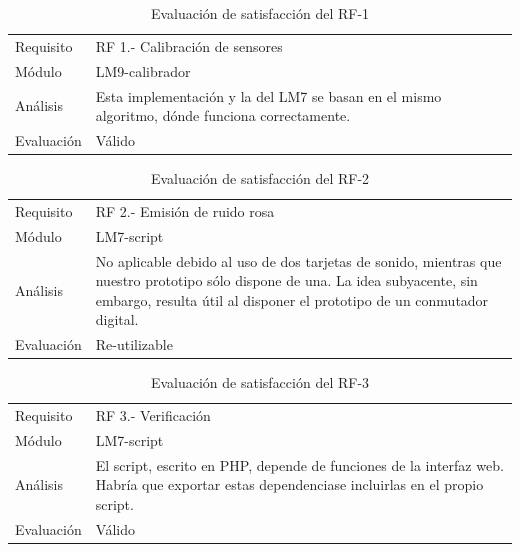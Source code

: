 \begin{table}[h]
\centering
\begin{tabularx}{1\textwidth}{l|X}
Requisito  & RF 1.- Calibración de sensores                                                                 \\
Módulo     & LM9-calibrador                                                                              \\
Análisis   & Esta implementación y la del \acrshort{LM7} se basan en el mismo algoritmo, dónde funciona correctamente. \\
Evaluación & Válido
\end{tabularx}
\caption{Evaluación de satisfacción del RF-1}
\end{table}

\begin{table}[h]
\centering
\begin{tabularx}{1\textwidth}{l|X}
Requisito  & RF 2.- Emisión de ruido rosa                                                                \\
Módulo     & LM7-script                                                                              \\
Análisis   & No aplicable debido al uso de dos tarjetas de sonido, mientras que nuestro prototipo sólo dispone de una. La idea subyacente, sin embargo, resulta útil al disponer el prototipo de un conmutador digital. \\
Evaluación & Re-utilizable
\end{tabularx}
\caption{Evaluación de satisfacción del RF-2}
\end{table}

\begin{table}[h]
\centering
\begin{tabularx}{1\textwidth}{l|X}
Requisito  & RF 3.- Verificación                                                                \\
Módulo     & LM7-script                                                                             \\
Análisis   & El script, escrito en PHP, depende de funciones de la interfaz web. Habría que exportar estas dependenciase incluirlas en el propio script. \\
Evaluación & Válido
\end{tabularx}
\caption{Evaluación de satisfacción del RF-3}
\end{table}

